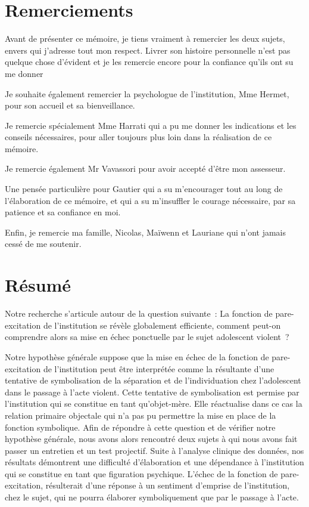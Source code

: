 \documentclass[12pt, a4paper]{book}
\begin{document}
\begin{spacing}{1.5}

\frontmatter

\chapter*{Remerciements}
\thispagestyle{empty}
Avant de présenter ce mémoire, je tiens vraiment à remercier les deux sujets, envers qui j'adresse tout mon respect. Livrer son histoire personnelle n'est pas quelque chose d’évident et je les remercie encore pour la confiance qu’ils ont su me donner

Je souhaite également remercier la psychologue de l'institution, Mme Hermet, pour son accueil et sa bienveillance.

Je remercie spécialement Mme Harrati qui a pu me donner les indications et les conseils nécessaires, pour aller toujours plus loin dans la réalisation de ce mémoire.

Je remercie également Mr Vavassori pour avoir accepté d’être mon assesseur.

Une pensée particulière pour Gautier qui a su m'encourager tout au long de l'élaboration de ce mémoire, et qui a su m’insuffler le courage nécessaire, par sa patience et sa confiance en moi.

Enfin, je remercie ma famille, Nicolas, Maïwenn et Lauriane qui n'ont jamais cessé de me soutenir.

\chapter*{Résumé}
\thispagestyle{empty}

Notre recherche s’articule autour de la question suivante : La fonction de pare-excitation de l’institution se révèle globalement efficiente, comment peut-on comprendre alors sa mise en échec ponctuelle par le sujet adolescent violent ?

Notre hypothèse générale suppose que la mise en échec de la fonction de pare-excitation de l’institution peut être interprétée comme la résultante d’une tentative de symbolisation de la séparation et de l’individuation chez l’adolescent dans le passage à l’acte violent. Cette tentative de symbolisation est permise par l’institution qui se constitue en tant qu’objet-mère. Elle réactualise dans ce cas la relation primaire objectale qui n’a pas pu permettre la mise en place de la fonction symbolique. Afin de répondre à cette question et de vérifier notre hypothèse générale, nous avons alors rencontré deux sujets à qui nous avons fait passer un entretien et un test projectif. Suite à l’analyse clinique des données, nos résultats démontrent une difficulté d’élaboration et une dépendance à l’institution qui se constitue en tant que figuration psychique. L’échec de la fonction de pare-excitation, résulterait d’une réponse à un sentiment d’emprise de l’institution, chez le sujet, qui ne pourra élaborer symboliquement que par le passage à l’acte.


\end{spacing}
\end{document}
